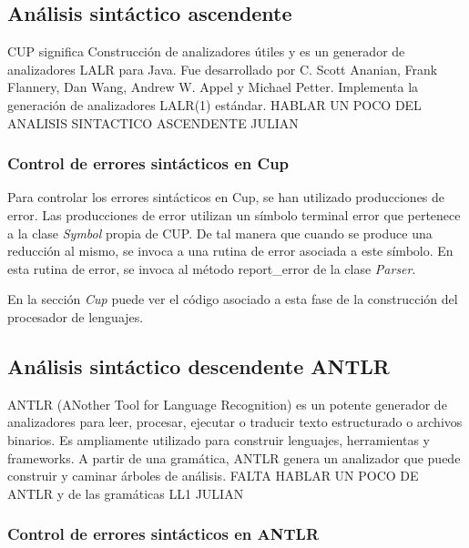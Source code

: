 \documentclass[12pt,a4paper]{article}
\begin{document}
\subsection{Análisis sintáctico ascendente}
CUP significa Construcción de analizadores útiles y es un generador de analizadores LALR para Java. Fue desarrollado por C. Scott Ananian, Frank Flannery, Dan Wang, Andrew W. Appel y Michael Petter. Implementa la generación de analizadores LALR(1) estándar. HABLAR UN POCO DEL ANALISIS SINTACTICO ASCENDENTE
JULIAN
\subsubsection{Control de errores sintácticos en Cup}

Para controlar los errores sintácticos en Cup, se han utilizado producciones de error. Las producciones de error utilizan un símbolo terminal error que pertenece a la clase \textit{Symbol} propia de CUP.\newline
De tal manera que cuando se produce una reducción al mismo, se invoca a una rutina de error asociada a este símbolo. En esta rutina de error, se invoca al método report\_error de la clase \textit{Parser}.

En la sección \textit{Cup} puede ver el código asociado a esta fase de la construcción del procesador de lenguajes.
\clearpage
\subsection{Análisis sintáctico descendente ANTLR}
ANTLR (ANother Tool for Language Recognition) es un potente generador de analizadores para leer, procesar, ejecutar o traducir texto estructurado o archivos binarios. Es ampliamente utilizado para construir lenguajes, herramientas y frameworks. A partir de una gramática, ANTLR genera un analizador que puede construir y caminar árboles de análisis.
FALTA HABLAR UN POCO DE ANTLR y de las gramáticas LL1 JULIAN
\subsubsection{Control de errores sintácticos en ANTLR}
\end{document}
